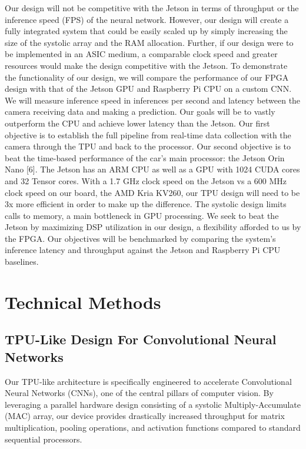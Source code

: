 \documentclass[11pt,a4paper,twoside]{article}
\begin{document}
Our design will not be competitive with the Jetson in terms of throughput or the inference speed (FPS) of the neural network. However, our design will create a fully integrated system that could be easily scaled up by simply increasing the size of the systolic array and the RAM allocation. Further, if our design were to be implemented in an ASIC medium, a comparable clock speed and greater resources would make the design competitive with the Jetson. To demonstrate the functionality of our design, we will compare the performance of our FPGA design with that of the Jetson GPU and Raspberry Pi CPU on a custom CNN. We will measure inference speed in inferences per second and latency between the camera receiving data and making a prediction. Our goals will be to vastly outperform the CPU and achieve lower latency than the Jetson. Our first objective is to establish the full pipeline from real-time data collection with the camera through the TPU and back to the processor. Our second objective is to beat the time-based performance of the car's main processor: the Jetson Orin Nano [6]. The Jetson has an ARM CPU as well as a GPU with 1024 CUDA cores and 32 Tensor cores. With a 1.7 GHz clock speed on the Jetson vs a 600 MHz clock speed on our board, the AMD Kria KV260, our TPU design will need to be 3x more efficient in order to make up the difference. The systolic design limits calls to memory, a main bottleneck in GPU processing. We seek to beat the Jetson by maximizing DSP utilization in our design, a flexibility afforded to us by the FPGA. Our objectives will be benchmarked by comparing the system's inference latency and throughput against the Jetson and Raspberry Pi CPU baselines.

\section{Technical Methods}

\subsection{TPU-Like Design For Convolutional Neural Networks}

Our TPU-like architecture is specifically engineered to accelerate Convolutional Neural Networks (CNNs), one of the central pillars of computer vision. By leveraging a parallel hardware design consisting of a systolic Multiply-Accumulate (MAC) array, our device provides drastically increased throughput for matrix multiplication, pooling operations, and activation functions compared to standard sequential processors.
\end{document}
